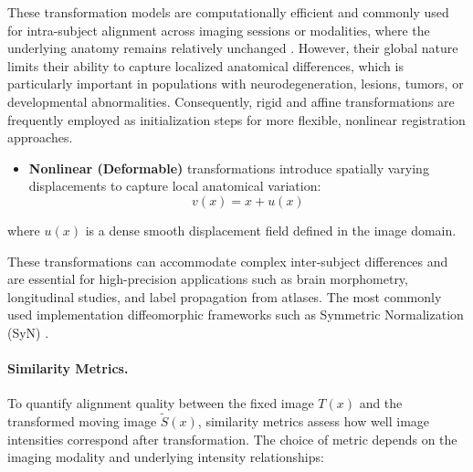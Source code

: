 These transformation models are computationally efficient and commonly used for intra-subject alignment across imaging sessions or modalities, where the underlying anatomy remains relatively unchanged \cite{Jenkinson2002-ab}. However, their global nature limits their ability to capture localized anatomical differences, which is particularly important in populations with neurodegeneration, lesions, tumors, or developmental abnormalities. Consequently, rigid and affine transformations are frequently employed as initialization steps for more flexible, nonlinear registration approaches.
\begin{itemize}
\item \textbf{Nonlinear (Deformable)} transformations introduce spatially varying displacements to capture local anatomical variation:
\begin{equation}
    v(x) = x + u(x)
    \label{eq:deformable}
\end{equation}
\end{itemize}
where \( u(x) \) is a dense smooth displacement field defined in the image domain. 

These transformations can accommodate complex inter-subject differences and are essential for high-precision applications such as brain morphometry, longitudinal studies, and label propagation from atlases. The most commonly used implementation diffeomorphic frameworks such as Symmetric Normalization (SyN) \cite{Avants2008-ek, Beg2005-yo}.

\paragraph{Similarity Metrics.}
To quantify alignment quality between the fixed image \( T(x) \) and the transformed moving image \( \tilde{S}(x) \), similarity metrics assess how well image intensities correspond after transformation. The choice of metric depends on the imaging modality and underlying intensity relationships:

